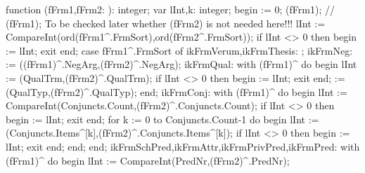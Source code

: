 \nwenddocs{}\endmoddef\nwstartdeflinemarkup{}\nwenddeflinemarkup
function (fFrm1,fFrm2: ): integer;
var
   lInt,k: integer;
begin
    := 0;
   (fFrm1);
   // (fFrm1); To be checked later whether (fFrm2) is not needed here!!!
   lInt := CompareInt(ord(fFrm1^.FrmSort),ord(fFrm2^.FrmSort));
   if lInt <> 0 then begin  := lInt; exit end;
   case fFrm1^.FrmSort of
      ikFrmVerum,ikFrmThesis: ;
      ikFrmNeg:  := ((fFrm1)^.NegArg,(fFrm2)^.NegArg);
      ikFrmQual:
         with (fFrm1)^ do
      begin
         lInt := (QualTrm,(fFrm2)^.QualTrm);
         if lInt <> 0 then begin  := lInt; exit end;
          := (QualTyp,(fFrm2)^.QualTyp);
      end;
      ikFrmConj:
         with (fFrm1)^ do
      begin
         lInt := CompareInt(Conjuncts.Count,(fFrm2)^.Conjuncts.Count);
         if lInt <> 0 then begin  := lInt; exit end;
         for k := 0 to Conjuncts.Count-1 do
         begin
            lInt := (Conjuncts.Items^[k],(fFrm2)^.Conjuncts.Items^[k]);
            if lInt <> 0 then begin  := lInt; exit end;
         end;
      end;
      ikFrmSchPred,ikFrmAttr,ikFrmPrivPred,ikFrmPred:
         with (fFrm1)^ do
      begin
         lInt := CompareInt(PredNr,(fFrm2)^.PredNr);
